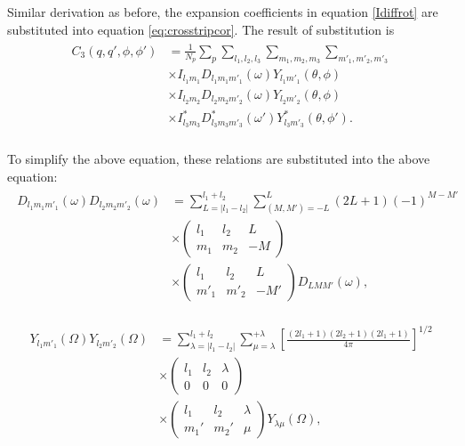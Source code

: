 Similar derivation as before, the expansion coefficients in equation \ref{Idiffrot} are substituted into equation \ref{eq:crosstripcor}. The result of substitution is
\begin{align}
\begin{split}
C_{3}(q,q',\phi,\phi') &= \frac{1}{N_{p}} \sum_{p} \sum_{l_{1},l_{2},l_{3}} \sum_{m_{1},m_{2},m_{3}} \sum_{m'_{1},m'_{2},m'_{3}} \\ 
&\times I_{l_{1}m_{1}} D_{l_{1}m_{1}m'_{1}}(\omega) Y_{l_{1}m'_{1}}(\theta,\phi) \\ 
&\times I_{l_{2}m_{2}} D_{l_{2}m_{2}m'_{2}}(\omega) Y_{l_{2}m'_{2}}(\theta,\phi) \\ 
&\times I^{*}_{l_{3}m_{3}} D^{*}_{l_{3}m_{3}m'_{3}}(\omega') Y^{*}_{l_{3}m'_{3}}(\theta,\phi' ). \\ 
\label{eq:c3subs}
\end{split}
\end{align}

To simplify the above equation, these relations are substituted into the above equation:
\begin{align}
\label{eq:triprel1}
\begin{split}
D_{l_{1}m_{1}m'_{1}}(\omega) D_{l_{2}m_{2}m'_{2}}(\omega)&= \sum^{l_1+l_2}_{L=|l_1-l_2|} \sum_{(M,M')=-L}^{L}(2L+1)(-1)^{M-M'}  \\ 
&\times\left( \begin{array}{ccc}
l_1 & l_2 & L \\
m_1 & m_2 & -M  \end{array} \right)  \\ 
&\times\left( \begin{array}{ccc}
l_1 & l_2 & L \\
m'_1 & m'_2 & -M'  \end{array} \right) D_{LMM'}(\omega), 
\end{split}
\end{align}

\begin{align}
\label{eq:triprel2}
\begin{split}
Y_{l_1 m'_1}(\Omega)Y_{l_2 m'_2}(\Omega) &= \sum_{\lambda=|l_1-l_2|}^{l_1+l_2} \sum_{\mu=\lambda}^{+\lambda} \left[\frac{(2l_1+1)(2l_2+1)(2l_1+1)}{4 \pi}\right]^{1/2} \\
&\times \left( \begin{array}{ccc}
l_1 & l_2 & \lambda \\
0 & 0 & 0  \end{array} \right)  \\ 
&\times \left( \begin{array}{ccc}
l_1 & l_2 & \lambda \\
m_1' & m_2' & \mu  \end{array} \right) Y_{\lambda\mu}(\Omega), \\  
\end{split}
\end{align}

